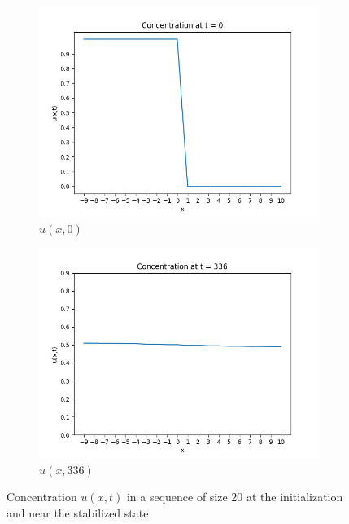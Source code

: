 \begin{figure}[h]
    \centering
    \begin{subfigure}[b]{0.49\textwidth}
        \centering
        \includegraphics[width=\textwidth]{figures/concentration_at_t_0_size_20.png}
        \caption{$u(x,0)$}
        \label{fig:u_0}
    \end{subfigure}
    \hfill
    \begin{subfigure}[b]{0.49\textwidth}
        \centering
        \includegraphics[width=\textwidth]{figures/concentration_at_t_336_size_20.png}
        \caption{$u(x,336)$}
        \label{fig:u_336}
    \end{subfigure}
    \caption{Concentration $u(x,t)$ in a sequence of size 20 at the initialization and near
    the stabilized state}
    \label{fig:seq_20}
\end{figure}

